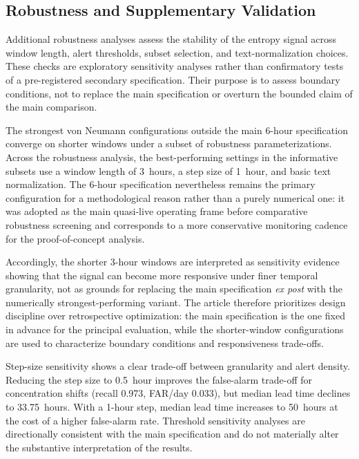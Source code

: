 \documentclass[sigconf]{acmart}
\begin{document}
\subsection{Robustness and Supplementary Validation}

Additional robustness analyses assess the stability of the entropy signal across window length, alert thresholds, subset selection, and text-normalization choices. These checks are exploratory sensitivity analyses rather than confirmatory tests of a pre-registered secondary specification. Their purpose is to assess boundary conditions, not to replace the main specification or overturn the bounded claim of the main comparison.

The strongest von Neumann configurations outside the main 6-hour specification converge on shorter windows under a subset of robustness parameterizations. Across the robustness analysis, the best-performing settings in the informative subsets use a window length of 3~hours, a step size of 1~hour, and basic text normalization. The 6-hour specification nevertheless remains the primary configuration for a methodological reason rather than a purely numerical one: it was adopted as the main quasi-live operating frame before comparative robustness screening and corresponds to a more conservative monitoring cadence for the proof-of-concept analysis.

Accordingly, the shorter 3-hour windows are interpreted as sensitivity evidence showing that the signal can become more responsive under finer temporal granularity, not as grounds for replacing the main specification \textit{ex post} with the numerically strongest-performing variant. The article therefore prioritizes design discipline over retrospective optimization: the main specification is the one fixed in advance for the principal evaluation, while the shorter-window configurations are used to characterize boundary conditions and responsiveness trade-offs.

Step-size sensitivity shows a clear trade-off between granularity and alert density. Reducing the step size to 0.5~hour improves the false-alarm trade-off for concentration shifts (recall 0.973, FAR/day 0.033), but median lead time declines to 33.75~hours. With a 1-hour step, median lead time increases to 50~hours at the cost of a higher false-alarm rate. Threshold sensitivity analyses are directionally consistent with the main specification and do not materially alter the substantive interpretation of the results.
\end{document}

